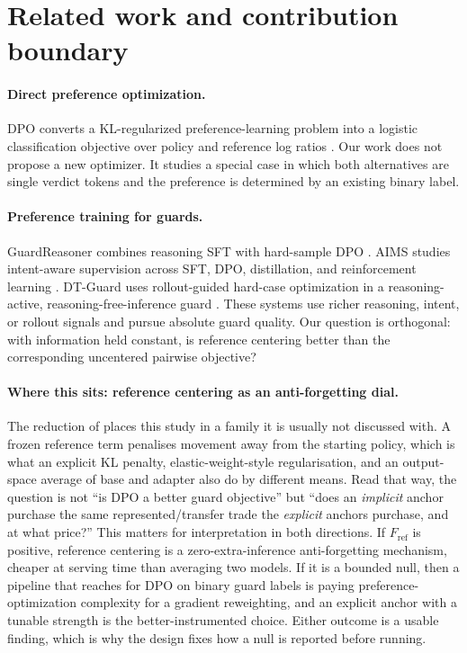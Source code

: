 \section{Related work and contribution boundary}

\paragraph{Direct preference optimization.}
DPO converts a KL-regularized preference-learning problem into a logistic
classification objective over policy and reference log ratios
\citep{rafailov2023dpo}. Our work does not propose a new optimizer. It studies a
special case in which both alternatives are single verdict tokens and the
preference is determined by an existing binary label.

\paragraph{Preference training for guards.}
GuardReasoner combines reasoning SFT with hard-sample DPO
\citep{liu2025guardreasoner}. AIMS studies intent-aware supervision across SFT,
DPO, distillation, and reinforcement learning \citep{ferrao2026aims}. DT-Guard
uses rollout-guided hard-case optimization in a reasoning-active,
reasoning-free-inference guard \citep{liu2026dtguard}. These systems use richer
reasoning, intent, or rollout signals and pursue absolute guard quality. Our
question is orthogonal: with information held constant, is reference centering
better than the corresponding uncentered pairwise objective?

\paragraph{Where this sits: reference centering as an anti-forgetting dial.}
The reduction of  places this study in a family it is usually
not discussed with. A frozen reference term penalises movement away from the
starting policy, which is what an explicit KL penalty, elastic-weight-style
regularisation, and an output-space average of base and adapter also do by
different means. Read that way, the question is not ``is DPO a better guard
objective'' but ``does an \emph{implicit} anchor purchase the same
represented/transfer trade the \emph{explicit} anchors purchase, and at what
price?'' This matters for interpretation in both directions. If
$F_{\mathrm{ref}}$ is positive, reference centering is a zero-extra-inference
anti-forgetting mechanism, cheaper at serving time than averaging two models. If
it is a bounded null, then a pipeline that reaches for DPO on binary guard labels
is paying preference-optimization complexity for a gradient reweighting, and an
explicit anchor with a tunable strength is the better-instrumented choice. Either
outcome is a usable finding, which is why the design fixes how a null is reported
before running.

